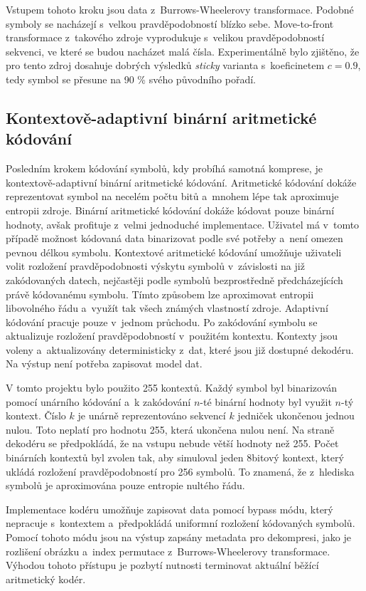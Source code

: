 \documentclass[a4paper, 11pt, titlepage]{article}
\begin{document}
	Vstupem tohoto kroku jsou data z~Burrows-Wheelerovy transformace.
	Podobné symboly se nacházejí s~velkou prav\-dě\-po\-dob\-nos\-tí blízko sebe.
	Move-to-front transformace z~takového zdroje vyprodukuje s~velikou pravděpodobností sekvenci, ve které se budou nacházet malá čísla.
	Experimentálně bylo zjištěno, že pro tento zdroj dosahuje dobrých výsledků \textit{sticky} varianta s~koeficinetem $c = 0.9$, tedy symbol se přesune na 90 \% svého původního pořadí.

	\subsection*{Kontextově-adaptivní binární aritmetické kódování}
	Posledním krokem kódování symbolů, kdy probíhá samotná komprese, je kontextově-adaptivní binární aritmetické kódování.
	Aritmetické kódování dokáže reprezentovat symbol na necelém počtu bitů a~mnohem lépe tak aproximuje entropii zdroje.
	Binární aritmetické kódování dokáže kódovat pouze binární hodnoty, avšak profituje z~velmi jednoduché implementace.
	Uživatel má v~tomto případě možnost kódovaná data binarizovat podle své potřeby a~není omezen pevnou délkou symbolu.
	Kontextové aritmetické kódování umožňuje uživateli volit rozložení pravděpodobnosti výskytu symbolů v~závislosti na již zakódovaných datech, nejčastěji podle symbolů bezprostředně před\-chá\-ze\-jí\-cí\-ch právě kódovanému symbolu.
	Tímto způsobem lze aproximovat entropii libovolného řádu a~využít tak všech známých vlastností zdroje.
	Adaptivní kódování pracuje pouze v~jednom průchodu. Po zakódování symbolu se aktualizuje rozložení pravděpodobností v~použitém kontextu.
	Kontexty jsou voleny a~aktualizovány deterministicky z~dat, které jsou již dostupné dekodéru.
	Na výstup není potřeba zapisovat model dat.

	V tomto projektu bylo použito 255 kontextů. Každý symbol byl binarizován pomocí unárního kódování a~k zakódování $n$-té binární hodnoty byl využit $n$-tý kontext.
	Číslo $k$ je unárně reprezentováno sekvencí $k$ jedniček ukončenou jednou nulou. Toto neplatí pro hodnotu 255, která ukončena nulou není.
	Na straně dekodéru se předpokládá, že na vstupu nebude větší hodnoty než 255.
	Počet binárních kontextů byl zvolen tak, aby simuloval jeden 8bitový kontext, který ukládá rozložení prav\-dě\-po\-dob\-nos\-tí pro 256 symbolů.
	To znamená, že z~hlediska symbolů je aproximována pouze entropie nultého řádu.

	Implementace kodéru umožňuje zapisovat data pomocí bypass módu, který nepracuje s~kontextem a~předpokládá uniformní rozložení kódovaných symbolů.
	Pomocí tohoto módu jsou na výstup zapsány metadata pro dekompresi, jako je rozlišení obrázku a~index permutace z~Burrows-Wheelerovy transformace.
	Výhodou tohoto přístupu je pozbytí nutnosti terminovat aktuální běžící aritmetický kodér.
\end{document}
